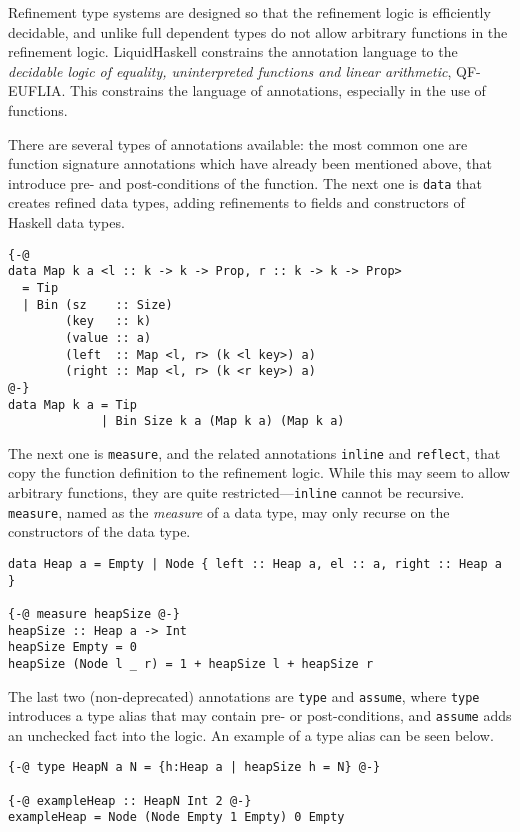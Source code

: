\documentclass[11pt]{article}
\begin{document}
Refinement type systems are designed so that the refinement logic is efficiently
decidable, and unlike full dependent types do not allow arbitrary functions in
the refinement logic. LiquidHaskell constrains the annotation language to the
\emph{decidable logic of equality, uninterpreted functions and linear arithmetic},
QF-EUFLIA. This constrains the language of annotations, especially in the use of
functions.

There are several types of annotations available: the most common one are
function signature annotations which have already been mentioned above, that
introduce pre- and post-conditions of the function. The next one is \texttt{data} that
creates refined data types, adding refinements to fields and constructors of
Haskell data types.

\begin{verbatim}
{-@
data Map k a <l :: k -> k -> Prop, r :: k -> k -> Prop>
  = Tip
  | Bin (sz    :: Size)
        (key   :: k)
        (value :: a)
        (left  :: Map <l, r> (k <l key>) a)
        (right :: Map <l, r> (k <r key>) a)
@-}
data Map k a = Tip
             | Bin Size k a (Map k a) (Map k a)
\end{verbatim}

The next one is \texttt{measure}, and the related annotations \texttt{inline} and \texttt{reflect}, that
copy the function definition to the refinement logic. While this may seem to
allow arbitrary functions, they are quite restricted---\texttt{inline} cannot be
recursive. \texttt{measure}, named as the \emph{measure} of a data type, may only recurse on the
constructors of the data type.

\begin{verbatim}
data Heap a = Empty | Node { left :: Heap a, el :: a, right :: Heap a }

{-@ measure heapSize @-}
heapSize :: Heap a -> Int
heapSize Empty = 0
heapSize (Node l _ r) = 1 + heapSize l + heapSize r
\end{verbatim}

The last two (non-deprecated) annotations are \texttt{type} and \texttt{assume}, where \texttt{type}
introduces a type alias that may contain pre- or post-conditions, and \texttt{assume}
adds an unchecked fact into the logic. An example of a type alias can be seen
below.

\begin{verbatim}
{-@ type HeapN a N = {h:Heap a | heapSize h = N} @-}

{-@ exampleHeap :: HeapN Int 2 @-}
exampleHeap = Node (Node Empty 1 Empty) 0 Empty
\end{verbatim}
\end{document}

